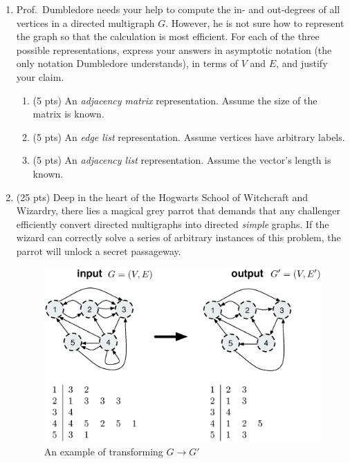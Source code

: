 \documentclass[12pt]{article}
\begin{document}
\begin{enumerate}
\item Prof.\ Dumbledore needs your help to compute the in- and out-degrees of all vertices in a directed multigraph $G$. However, he is not sure how to represent the graph so that the calculation is most efficient. For each of the three possible representations, express your answers in asymptotic notation (the only notation Dumbledore understands), in terms of $V$ and $E$, and justify your claim.
\begin{enumerate}
\item \label{3a} (5 pts) An {\em adjacency matrix} representation. Assume the size of the matrix is known.
\pagebreak
\item \label{3b} (5 pts) An {\em edge list} representation. Assume vertices have arbitrary labels.
\pagebreak
\item \label{3c} (5 pts) An {\em adjacency list} representation. Assume the vector's length is known.
\pagebreak
\end{enumerate}


\item \label{4} (25 pts) Deep in the heart of the Hogwarts School of Witchcraft and
Wizardry, there lies a magical grey parrot that demands that any challenger
efficiently convert directed multigraphs into directed \emph{simple}
graphs. If the wizard can correctly solve a series of arbitrary
instances of this problem, the parrot will unlock a secret passageway. 

\begin{figure}[h!]
\begin{center}
\includegraphics[scale=0.5]{adjacency_list.eps} \\
An example of transforming $G\to G'$
\end{center}
\label{fig:adjlist}
\end{figure}
	

\end{enumerate}
\end{document}
